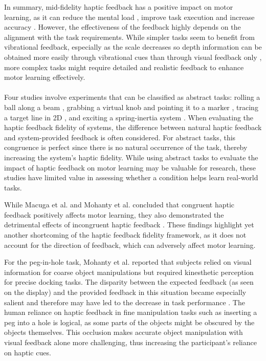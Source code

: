 In summary, mid-fidelity haptic feedback has a positive impact on motor learning, as it can reduce the mental load \cite{Yang2023}, improve task execution \cite{McAnally2023, LiuH2019} and increase accuracy \cite{Vasudevan2020}. However, the effectiveness of the feedback highly depends on the alignment with the task requirements. While simpler tasks seem to benefit from vibrational feedback, especially as the scale decreases so depth information can be obtained more easily through vibrational cues than through visual feedback only \cite{Vasudevan2020}, more complex tasks might require detailed and realistic feedback to enhance motor learning effectively.

\paragraph{}
Four studies involve experiments that can be classified as abstract tasks: rolling a ball along a beam \cite{Huang2006}, grabbing a virtual knob and pointing it to a marker \cite{Dai2023}, tracing a target line in 2D \cite{Fehlberg2012}, and exciting a spring-inertia system \cite{Huang2007}. When evaluating the haptic feedback fidelity of systems, the difference between natural haptic feedback and system-provided feedback is often considered. For abstract tasks, this congruence is perfect since there is no natural occurrence of the task, thereby increasing the system's haptic fidelity.
While using abstract tasks to evaluate the impact of haptic feedback on motor learning may be valuable for research, these studies have limited value in assessing whether a condition helps learn real-world tasks.

While Macuga et al. and Mohanty et al. concluded that congruent haptic feedback positively affects motor learning, they also demonstrated the detrimental effects of incongruent haptic feedback \cite{Macuga2019, Mohanty2023}. These findings highlight yet another shortcoming of the haptic feedback fidelity framework, as it does not account for the direction of feedback, which can adversely affect motor learning.

For the peg-in-hole task, Mohanty et al. reported that subjects relied on visual information for coarse object manipulations but required kinesthetic perception for precise docking tasks. The disparity between the expected feedback (as seen on the display) and the provided feedback in this situation became especially salient and therefore may have led to the decrease in task performance \cite{Mohanty2023}. 
The human reliance on haptic feedback in fine manipulation tasks such as inserting a peg into a hole is logical, as some parts of the objects might be obscured by the objects themselves. This occlusion makes accurate object manipulation with visual feedback alone more challenging, thus increasing the participant's reliance on haptic cues.

